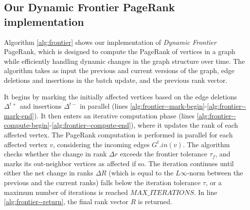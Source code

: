 \subsection{Our Dynamic Frontier PageRank implementation}

Algorithm \ref{alg:frontier} shows our implementation of \textit{Dynamic Frontier} PageRank, which is designed to compute the PageRank of vertices in a graph while efficiently handling dynamic changes in the graph structure over time. The algorithm takes as input the previous and current versions of the graph, edge deletions and insertions in the batch update, and the previous rank vector.

It begins by marking the initially affected vertices based on the edge deletions $\Delta^{t+}$ and insertions $\Delta^{t-}$ in parallel (lines \ref{alg:frontier--mark-begin}-\ref{alg:frontier--mark-end}). It then enters an iterative computation phase (lines \ref{alg:frontier--compute-begin}-\ref{alg:frontier--compute-end}), where it updates the rank of each affected vertex. The PageRank computation is performed in parallel for each affected vertex $v$, considering the incoming edges $G^t.in(v)$. The algorithm checks whether the change in rank $\Delta r$ exceeds the frontier tolerance $\tau_f$, and marks its out-neighbor vertices as affected if so. The iteration continues until either the net change in ranks $\Delta R$ (which is equal to the $L\infty$-norm between the previous and the current ranks) falls below the iteration tolerance $\tau$, or a maximum number of iterations is reached $MAX\_ITERATIONS$. In line \ref{alg:frontier--return}, the final rank vector $R$ is returned.




